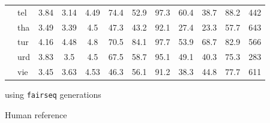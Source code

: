 \begin{threeparttable}
\begin{tabular}{ll|ccc|ccc|ccc|c}
 & tel & 3.84 & 3.14 & 4.49 & 74.4 & 52.9 & 97.3 & 60.4 & 38.7 & 88.2 & 442 \\
 & tha & 3.49 & 3.39 & 4.5 & 47.3 & 43.2 & 92.1 & 27.4 & 23.3 & 57.7 & 643 \\
 & tur & 4.16 & 4.48 & 4.8 & 70.5 & 84.1 & 97.7 & 53.9 & 68.7 & 82.9 & 566 \\
 & urd & 3.83 & 3.5 & 4.5 & 67.5 & 58.7 & 95.1 & 49.1 & 40.3 & 75.3 & 283 \\
 & vie & 3.45 & 3.63 & 4.53 & 46.3 & 56.1 & 91.2 & 38.3 & 44.8 & 77.7 & 611 \\
\bottomrule
\end{tabular}
\begin{tablenotes}
\item[1] \mfourtlg using \texttt{fairseq} generations
\item[2] \whisperlarge
\item[3] Human reference
\end{tablenotes}
\end{threeparttable}